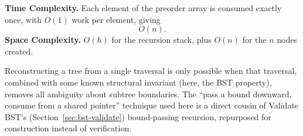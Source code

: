 \begin{complexitybox}
\textbf{Time Complexity.} Each element of the preorder array is consumed
exactly once, with $O(1)$ work per element, giving
\[
  O(n).
\]
\textbf{Space Complexity.} $O(h)$ for the recursion stack, plus $O(n)$
for the $n$ nodes created.
\end{complexitybox}

\begin{takeawaybox}
Reconstructing a tree from a single traversal is only possible when that
traversal, combined with some known structural invariant (here, the BST
property), removes all ambiguity about subtree boundaries. The ``pass a
bound downward, consume from a shared pointer'' technique used here is a
direct cousin of Validate BST's (Section~\ref{sec:bst-validate}) bound-passing
recursion, repurposed for construction instead of verification.
\end{takeawaybox}
